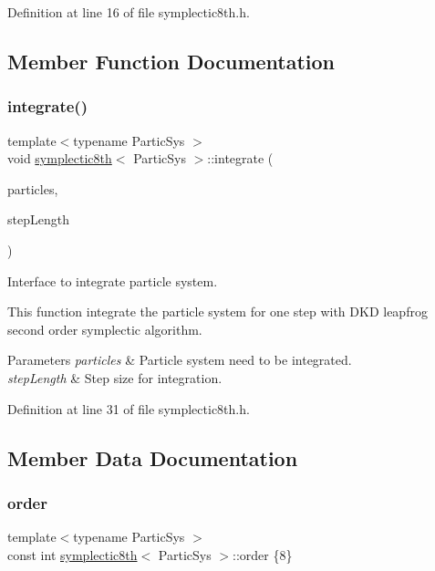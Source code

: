 Definition at line 16 of file symplectic8th.\+h.



\subsection{Member Function Documentation}
\mbox{\label{classsymplectic8th_a6d3406699e9edfe9fe0791821b719fe0}} 
\subsubsection{\texorpdfstring{integrate()}{integrate()}}
{\footnotesize\ttfamily template$<$typename Partic\+Sys $>$ \\
void \mbox{\hyperlink{classsymplectic8th}{symplectic8th}}$<$ Partic\+Sys $>$\+::integrate (\begin{DoxyParamCaption}\item[{Partic\+Sys \&}]{particles,  }\item[{\mbox{\hyperlink{classsymplectic8th_a3a85c2b58a75f2da56a6989a73a001b8}{Scalar}}}]{step\+Length }\end{DoxyParamCaption})}



Interface to integrate particle system. 

This function integrate the particle system for one step with D\+KD leapfrog second order symplectic algorithm. 
\begin{DoxyParams}{Parameters}
{\em particles} & Particle system need to be integrated. \\
\hline
{\em step\+Length} & Step size for integration. \\
\hline
\end{DoxyParams}


Definition at line 31 of file symplectic8th.\+h.



\subsection{Member Data Documentation}
\mbox{\label{classsymplectic8th_a5f80ae81362e3542cb9ed7653f1b20d6}} 
\subsubsection{\texorpdfstring{order}{order}}
{\footnotesize\ttfamily template$<$typename Partic\+Sys $>$ \\
const int \mbox{\hyperlink{classsymplectic8th}{symplectic8th}}$<$ Partic\+Sys $>$\+::order \{8\}\hspace{0.3cm}{\ttfamily [static]}}



